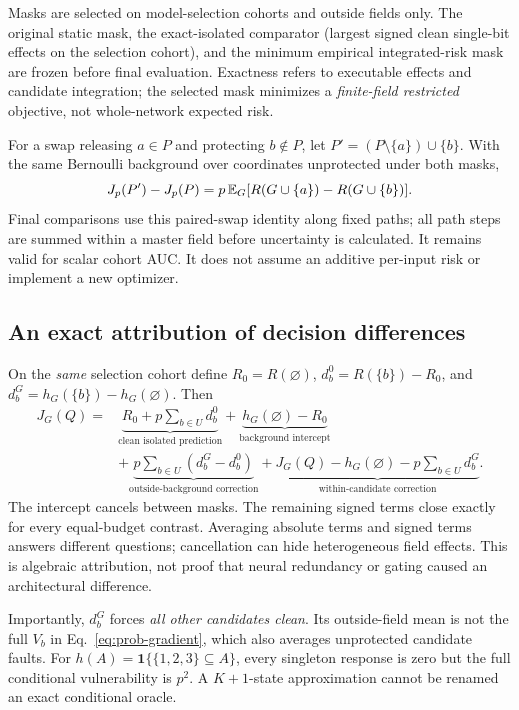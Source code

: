 Masks are selected on model-selection cohorts and outside fields only. The original static mask, the exact-isolated comparator (largest signed clean single-bit effects on the selection cohort), and the minimum empirical integrated-risk mask are frozen before final evaluation. Exactness refers to executable effects and candidate integration; the selected mask minimizes a \emph{finite-field restricted} objective, not whole-network expected risk.

For a swap releasing $a\in P$ and protecting $b\notin P$, let $P'=(P\setminus\{a\})\cup\{b\}$. With the same Bernoulli background over coordinates unprotected under both masks,
\begin{equation}\label{eq:swap}
J_p(P')-J_p(P)=p\,\mathbb{E}_G[R(G\cup\{a\})-R(G\cup\{b\})].
\end{equation}
Final comparisons use this paired-swap identity along fixed paths; all path steps are summed within a master field before uncertainty is calculated. It remains valid for scalar cohort AUC. It does not assume an additive per-input risk or implement a new optimizer.

\subsection{An exact attribution of decision differences}\label{sec:decomposition}
On the \emph{same} selection cohort define $R_0=R(\varnothing)$, $d_b^0=R(\{b\})-R_0$, and $d_b^G=h_G(\{b\})-h_G(\varnothing)$. Then
\begin{align}\label{eq:decomposition}
J_G(Q)={}&\underbrace{R_0+p\sum_{b\in U}d_b^0}_{\text{clean isolated prediction}}
+\underbrace{h_G(\varnothing)-R_0}_{\text{background intercept}}\nonumber\\
&+\underbrace{p\sum_{b\in U}(d_b^G-d_b^0)}_{\text{outside-background correction}}
+\underbrace{J_G(Q)-h_G(\varnothing)-p\sum_{b\in U}d_b^G}_{\text{within-candidate correction}}.
\end{align}
The intercept cancels between masks. The remaining signed terms close exactly for every equal-budget contrast. Averaging absolute terms and signed terms answers different questions; cancellation can hide heterogeneous field effects. This is algebraic attribution, not proof that neural redundancy or gating caused an architectural difference.

Importantly, $d_b^G$ forces \emph{all other candidates clean}. Its outside-field mean is not the full $V_b$ in Eq.~\eqref{eq:prob-gradient}, which also averages unprotected candidate faults. For $h(A)=\mathbf1\{\{1,2,3\}\subseteq A\}$, every singleton response is zero but the full conditional vulnerability is $p^2$. A $K+1$-state approximation cannot be renamed an exact conditional oracle.

